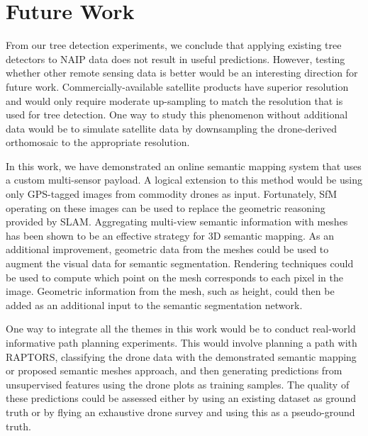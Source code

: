 
\section{Future Work}
From our tree detection experiments, we conclude that applying existing tree detectors to NAIP data does not result in useful predictions. However, testing whether other remote sensing data is better would be an interesting direction for future work. Commercially-available satellite products have superior resolution and would only require moderate up-sampling to match the resolution that is used for tree detection. One way to study this phenomenon without additional data would be to simulate satellite data by downsampling the drone-derived orthomosaic to the appropriate resolution. 

In this work, we have demonstrated an online semantic mapping system that uses a custom multi-sensor payload. A logical extension to this method would be using only GPS-tagged images from commodity drones as input. Fortunately, SfM operating on these images can be used to replace the geometric reasoning provided by SLAM. Aggregating multi-view semantic information with meshes has been shown to be an effective strategy for 3D semantic mapping. As an additional improvement, geometric data from the meshes could be used to augment the visual data for semantic segmentation. Rendering techniques could be used to compute which point on the mesh corresponds to each pixel in the image. Geometric information from the mesh, such as height, could then be added as an additional input to the semantic segmentation network.

One way to integrate all the themes in this work would be to conduct real-world informative path planning experiments. This would involve planning a path with RAPTORS, classifying the drone data with the demonstrated semantic mapping or proposed semantic meshes approach, and then generating predictions from unsupervised features using the drone plots as training samples. The quality of these predictions could be assessed either by using an existing dataset as ground truth or by flying an exhaustive drone survey and using this as a pseudo-ground truth. 

